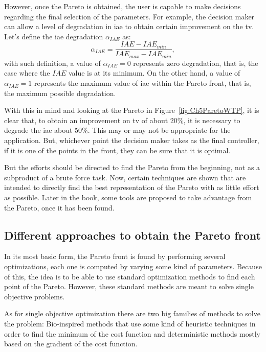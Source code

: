 However, once the Pareto is obtained, the user is capable to make decisions regarding the final selection of the parameters. For example, the decision maker can allow a level of degradation in \gls{iae} to obtain certain improvement on the \gls{tv}. Let's define the \gls{iae} degradation $\alpha_{IAE}$ as:
\begin{equation*}
	\alpha_{IAE} = \frac{IAE - IAE_{min}}{IAE_{max}-IAE_{min}},
\end{equation*}
%
with such definition, a value of $\alpha_{IAE} = 0$ represents zero degradation, that is, the case where the $IAE$ value is at its minimum. On the other hand, a value of $\alpha_{IAE} = 1$ represents the maximum value of \gls{iae} within the Pareto front, that is, the maximum possible degradation.

With this in mind and looking at the Pareto in Figure~\ref{fig:Ch5ParetoWTP}, it is clear that, to obtain an improvement on \gls{tv} of about $20\%$, it is necessary to degrade the \gls{iae} about $50\%$. This may or may not be appropriate for the application. But, whichever point the decision maker takes as the final controller, if it is one of the points in the front, they can be sure that it is optimal.

But the efforts should be directed to find the Pareto from the beginning, not as a subproduct of a brute force task. Now, certain techniques are shown that are intended to directly find the best representation of the Pareto with as little effort as possible. Later in the book, some tools are proposed to take advantage from the Pareto, once it has been found.

\subsection{Different approaches to obtain the Pareto front}
\label{sec:ParetoApproach}
In its most basic form, the Pareto front is found by performing several optimizations, each one is computed by varying some kind of parameters. Because of this, the idea is to be able to use standard optimization methods to find each point of the Pareto. However, these standard methods are meant to solve single objective problems.

As for single objective optimization there are two big families of methods to solve the problem: Bio-inspired methods that use some kind of heuristic techniques in order to find the minimum of the cost function and deterministic methods mostly based on the gradient of the cost function.

